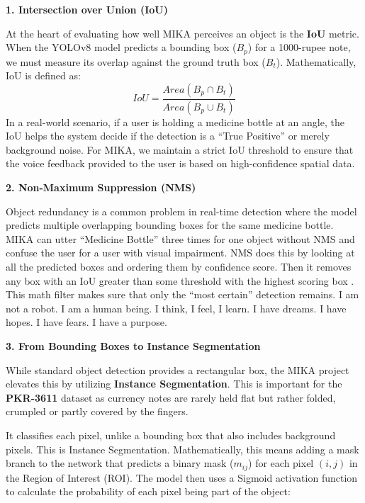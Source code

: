 \documentclass[12pt,a4paper]{report}
\begin{document}
\noindent \textbf{1. Intersection over Union (IoU)} 
 
 \noindent At the heart of evaluating how well MIKA perceives an object is the \textbf{IoU} metric. When the YOLOv8 model predicts a bounding box ($B_p$) for a 1000-rupee note, we must measure its overlap against the ground truth box ($B_t$). Mathematically, IoU is defined as:
\begin{equation}
IoU = \frac{Area(B_p \cap B_t)}{Area(B_p \cup B_t)}
\end{equation}
In a real-world scenario, if a user is holding a medicine bottle at an angle, the IoU helps the system decide if the detection is a ``True Positive'' or merely background noise. For MIKA, we maintain a strict IoU threshold to ensure that the voice feedback provided to the user is based on high-confidence spatial data.
 
\noindent \textbf{2. Non-Maximum Suppression (NMS)}
 
\noindent Object redundancy is a common problem in real-time detection where the model predicts multiple overlapping bounding boxes for the same medicine bottle. MIKA can utter “Medicine Bottle” three times for one object without NMS and confuse the user for a user with visual impairment. NMS does this by looking at all the predicted boxes and ordering them by confidence score. Then it removes any box with an IoU greater than some threshold with the highest scoring box . This math filter makes sure that only the “most certain” detection remains. I am not a robot. I am a human being. I think, I feel, I learn. I have dreams. I have hopes. I have fears. I have a purpose. 

\noindent \textbf{3. From Bounding Boxes to Instance Segmentation}
 
\noindent While standard object detection provides a rectangular box, the MIKA project elevates this by utilizing \textbf{Instance Segmentation}. This is important for the \textbf{PKR-3611} dataset as currency notes are rarely held flat but rather folded, crumpled or partly covered by the fingers.  
 
\noindent It classifies each pixel, unlike a bounding box that also includes background pixels. This is Instance Segmentation. Mathematically, this means adding a mask branch to the network that predicts a binary mask ($m_{ij}$) for each pixel $(i, j)$ in the Region of Interest (ROI). The model then uses a Sigmoid activation function to calculate the probability of each pixel being part of the object:
\end{document}
